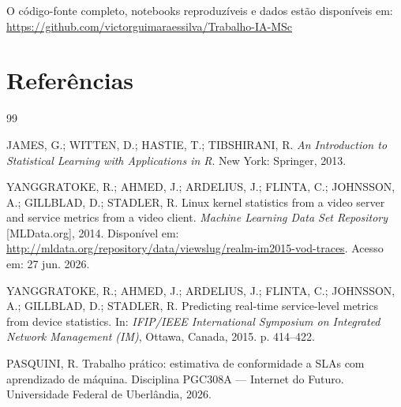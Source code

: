 \documentclass[12pt,a4paper]{article}
\begin{document}
O código-fonte completo, notebooks reproduzíveis e dados estão disponíveis em:\\
\url{https://github.com/victorguimaraessilva/Trabalho-IA-MSc}

\section*{Referências}

\begin{thebibliography}{99}

JAMES, G.; WITTEN, D.; HASTIE, T.; TIBSHIRANI, R.
\textit{An Introduction to Statistical Learning with Applications in R}.
New York: Springer, 2013.

YANGGRATOKE, R.; AHMED, J.; ARDELIUS, J.; FLINTA, C.; JOHNSSON, A.;
GILLBLAD, D.; STADLER, R.
Linux kernel statistics from a video server and service metrics from a video client.
\textit{Machine Learning Data Set Repository} [MLData.org], 2014.
Disponível em: \url{http://mldata.org/repository/data/viewslug/realm-im2015-vod-traces}.
Acesso em: 27 jun. 2026.

YANGGRATOKE, R.; AHMED, J.; ARDELIUS, J.; FLINTA, C.; JOHNSSON, A.;
GILLBLAD, D.; STADLER, R.
Predicting real-time service-level metrics from device statistics.
In: \textit{IFIP/IEEE International Symposium on Integrated Network Management (IM)},
Ottawa, Canada, 2015. p. 414--422.

PASQUINI, R.
Trabalho prático: estimativa de conformidade a SLAs com aprendizado de máquina.
Disciplina PGC308A --- Internet do Futuro.
Universidade Federal de Uberlândia, 2026.

\end{thebibliography}
\end{document}
